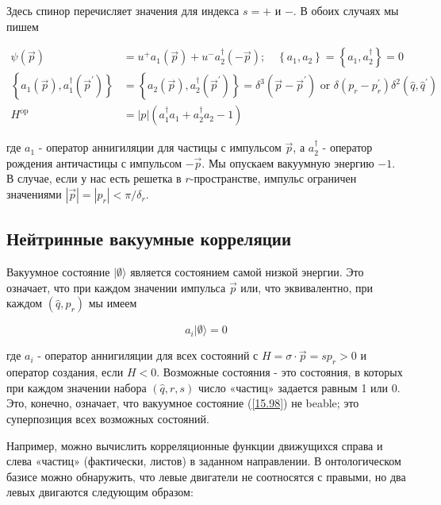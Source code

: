 \documentclass[main.tex]{subfiles}
\begin{document}
            
Здесь спинор перечисляет значения для индекса $s = +$ и $-$.
В обоих случаях мы пишем



\begin{equation}\label{15.95}
	\begin{aligned}
\psi(\vec{p}) &=u^{+} a_{1}(\vec{p})+u^{-} a_{2}^{\dagger}(-\vec{p}) ; \quad\left\{a_{1}, a_{2}\right\}=\left\{a_{1}, a_{2}^{\dagger}\right\}=0 \\
\left\{a_{1}(\vec{p}), a_{1}^{\dagger}\left(\vec{p}^{\prime}\right)\right\} &=\left\{a_{2}(\vec{p}), a_{2}^{\dagger}\left(\vec{p}^{\prime}\right)\right\}=\delta^{3}\left(\vec{p}-\vec{p}^{\prime}\right) \text { or } \delta\left(p_{r}-p_{r}^{\prime}\right) \delta^{2}\left(\hat{q}, \hat{q}^{\prime}\right) \\
H^{\mathrm{op}} &=|p|\left(a_{1}^{\dagger} a_{1}+a_{2}^{\dagger} a_{2}-1\right)
\end{aligned}
\end{equation}

где $a_1$ - оператор аннигиляции для частицы с импульсом $\vec p$, а $a_2^\dagger$ - оператор рождения античастицы с импульсом $-\vec p$. Мы опускаем вакуумную энергию $-1$. В случае, если у нас есть решетка в $r$-пространстве, импульс ограничен значениями $|\vec p| = |p_r| < \pi/\delta_r$.


\subsection{Нейтринные вакуумные корреляции}\label{ch15.3}

Вакуумное состояние $|\emptyset\rangle$ является состоянием самой низкой энергии. Это означает, что при каждом значении импульса $\vec p$ или, что эквивалентно, при каждом $(\hat q, p_r)$ мы имеем

\begin{equation}\label{15.98}
	a_{i}|\emptyset\rangle= 0
\end{equation}

           
где $a_i$ - оператор аннигиляции для всех состояний с $H = \sigma\cdot\vec p = sp_r > 0$ и оператор создания, если $H <0$. Возможные состояния - это состояния, в которых при каждом значении набора $(\hat q, r, s)$ число «частиц» задается равным 1 или 0. Это, конечно, означает, что вакуумное состояние (\ref{15.98}) не beable; это суперпозиция всех возможных состояний.

Например, можно вычислить корреляционные функции движущихся справа и слева «частиц» (фактически, листов) в заданном направлении. В онтологическом базисе можно обнаружить, что левые двигатели не соотносятся с правыми, но два левых двигаются следующим образом:
\end{document}
